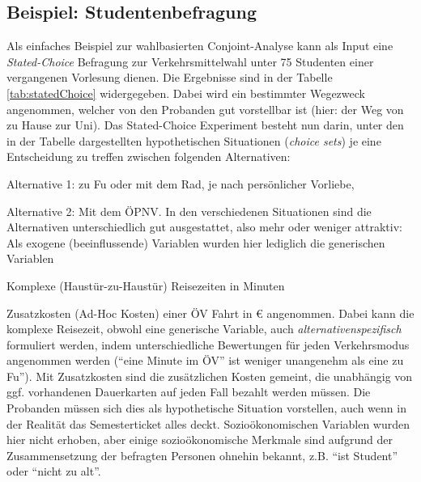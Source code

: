 \subsection{\label{sec:erh-studiBsp}Beispiel: Studentenbefragung}
Als einfaches Beispiel zur wahlbasierten Conjoint-Analyse  kann als
Input eine
\textit{Stated-Choice} Befragung zur Verkehrsmittelwahl 
unter 75 Studenten einer vergangenen Vorlesung dienen. Die Ergebnisse
sind in der Tabelle \ref{tab:statedChoice} widergegeben. Dabei wird
ein bestimmter Wegezweck angenommen, welcher von den Probanden gut
vorstellbar ist (hier: der Weg von zu Hause zur Uni).  Das Stated-Choice
Experiment besteht nun darin, unter den in der
Tabelle dargestellten hypothetischen Situationen (\emph{choice sets})
je eine Entscheidung 
zu treffen zwischen folgenden Alternativen:
\bi
\item Alternative 1: zu Fu\3 oder mit dem Rad, je nach pers\"onlicher Vorliebe,
\item Alternative 2: Mit dem \"OPNV.
\ei
In den verschiedenen Situationen sind die Alternativen
unterschiedlich gut ausgestattet, also mehr oder weniger attraktiv:
Als exogene (beeinflussende) Variablen wurden hier lediglich die
generischen Variablen
\bi
\item Komplexe (Haust\"ur-zu-Haust\"ur) Reisezeiten in Minuten
\item Zusatzkosten (Ad-Hoc Kosten) einer \"OV Fahrt in \euro{}
\ei
angenommen. Dabei kann die komplexe Reisezeit, obwohl eine generische
Variable, auch \emph{alternativenspezifisch} formuliert werden, indem
unterschiedliche Bewertungen f\"ur jeden Verkehrsmodus angenommen
werden (``eine Minute
im \"OV'' ist weniger unangenehm als eine zu Fu\3''). 
Mit Zusatzkosten sind die zus\"atzlichen Kosten gemeint, die
unabh\"angig von ggf. vorhandenen Dauerkarten auf jeden Fall bezahlt
werden m\"ussen. Die
Probanden m\"ussen sich dies als hypothetische Situation vorstellen, 
auch wenn in der Realit\"at das Semesterticket alles deckt.
Sozio\"okonomischen Variablen wurden hier nicht erhoben, aber einige
sozio\"okonomische Merkmale sind aufgrund der Zusammensetzung der
befragten Personen ohnehin bekannt, z.B. ``ist Student'' oder ``nicht
zu alt''.


